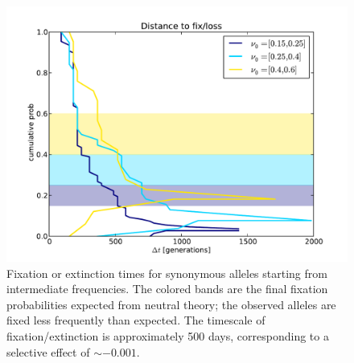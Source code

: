 \documentclass[12pt,a4paper,notitlepage,onecolumn]{article}
\begin{document}
\begin{figure}
\begin{center}
\includegraphics[width=\linewidth]{Shankarappa_fix_loss_dt_times}
\caption{Fixation or extinction times for synonymous alleles starting from
intermediate frequencies. The colored bands are the final fixation probabilities
expected from neutral theory; the observed alleles are fixed less frequently
than expected. The timescale of fixation/extinction is approximately 500 days,
corresponding to a selective effect of $\sim -0.001$.}
\label{fig:fixtimes}
\end{center}
\end{figure}
\end{document}
